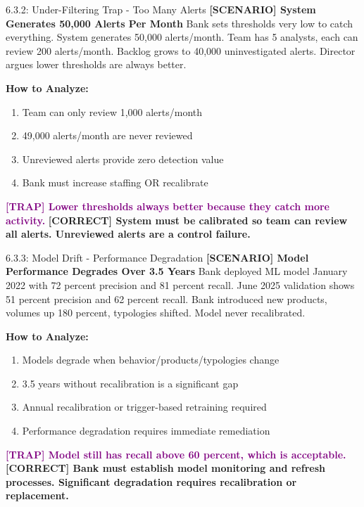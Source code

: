 \documentclass[11pt,a4paper]{beamer}
\newcommand{\trap}[1]{\textcolor{purple}{\textbf{[TRAP] #1}}}
\newcommand{\correct}[1]{\textcolor{green!50!black}{\textbf{[CORRECT] #1}}}
\newcommand{\scenario}[1]{\textcolor{blue!70!black}{\textbf{[SCENARIO] #1}}}
\begin{document}
\begin{frame}{6.3.2: Under-Filtering Trap - Too Many Alerts}
	\scenario{System Generates 50,000 Alerts Per Month}
	Bank sets thresholds very low to catch everything. System generates 50,000 alerts/month. Team has 5 analysts, each can review 200 alerts/month. Backlog grows to 40,000 uninvestigated alerts. Director argues lower thresholds are always better.
	
	\vspace{0.1cm}
	\textbf{How to Analyze:}
	\begin{enumerate}
		\item Team can only review 1,000 alerts/month
		\item 49,000 alerts/month are never reviewed
		\item Unreviewed alerts provide zero detection value
		\item Bank must increase staffing OR recalibrate
	\end{enumerate}
	\trap{Lower thresholds always better because they catch more activity.}
	\correct{System must be calibrated so team can review all alerts. Unreviewed alerts are a control failure.}
\end{frame}

\begin{frame}{6.3.3: Model Drift - Performance Degradation}
	\scenario{Model Performance Degrades Over 3.5 Years}
	Bank deployed ML model January 2022 with 72 percent precision and 81 percent recall. June 2025 validation shows 51 percent precision and 62 percent recall. Bank introduced new products, volumes up 180 percent, typologies shifted. Model never recalibrated.
	
	\vspace{0.1cm}
	\textbf{How to Analyze:}
	\begin{enumerate}
		\item Models degrade when behavior/products/typologies change
		\item 3.5 years without recalibration is a significant gap
		\item Annual recalibration or trigger-based retraining required
		\item Performance degradation requires immediate remediation
	\end{enumerate}
	\trap{Model still has recall above 60 percent, which is acceptable.}
	\correct{Bank must establish model monitoring and refresh processes. Significant degradation requires recalibration or replacement.}
\end{frame}
\end{document}
